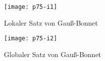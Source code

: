 \begin{minipage}{.45\textwidth}
  \begin{figure}[H]
    \texttt{[image: p75-i1]}
    \vspace*{1em}
    \caption{Lokaler Satz von Gauß-Bonnet}
  \end{figure}
\end{minipage}
\hfill
\begin{minipage}{.475\textwidth}
  \begin{figure}[H]
    \texttt{[image: p75-i2]}
    \caption{Globaler Satz von Gauß-Bonnet}
  \end{figure}
\end{minipage}